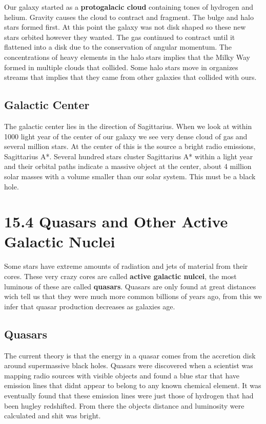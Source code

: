 \documentclass[12pt]{article}
\begin{document}
Our galaxy started as a \textbf{protogalacic cloud} containing tones of hydrogen and helium. Gravity causes the cloud to contract and fragment. The bulge and halo stars formed first. At this point the galaxy was not disk shaped so these new stars orbited however they wanted. The gas continued to contract until it flattened into a disk due to the conservation of angular momentum. The concentrations of heavy elements in the halo stars implies that the Milky Way formed in multiple clouds that collided. Some halo stars move in organizes streams that implies that they came from other galaxies that collided with ours.

\subsection{Galactic Center}
The galactic center lies in the direction of Sagittarius. When we look at within 1000 light year of the center of our galaxy we see very dense cloud of gas and several million stars. At the center of this is the source a bright radio emissions, Sagittarius A*. Several hundred stars cluster Sagittarius A* within a light year and their orbital paths indicate a massive object at the center, about 4 million solar masses with a volume smaller than our solar system. This must be a black hole.







\section{15.4 Quasars and Other Active Galactic Nuclei}
Some stars have extreme amounts of radiation and jets of material from their cores. These very crazy cores are called \textbf{active galactic nulcei}, the most luminous of these are called \textbf{quasars}. Quasars are only found at great distances wich tell us that they were much more common billions of years ago, from this we infer that quasar production decreases as galaxies age.

\subsection{Quasars}
The current theory is that the energy in a quasar comes from the accretion disk around supermassive black holes. Quasars were discovered when a scientist was mapping radio sources with visible objects and found a blue star that have emission lines that didnt appear to belong to any known chemical element. It was eventually found that these emission lines were just those of hydrogen that had been hugley redshifted. From there the objects distance and luminosity were calculated and shit was bright.
\end{document}
